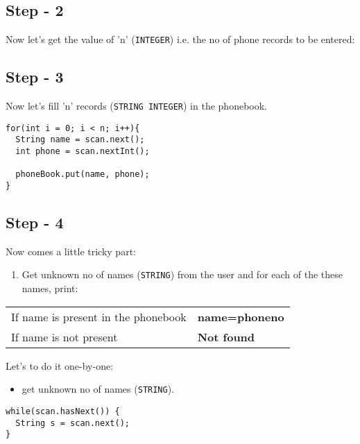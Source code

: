 \documentclass[11pt]{article}
\begin{document}
\subsection{Step - 2}
\label{sec:orgfd0e3b4}

Now let’s get the value of ’n’ (\texttt{INTEGER}) i.e. the no of phone records to be entered:

\subsection{Step - 3}
\label{sec:orgf1d191e}

Now let’s fill ’n’ records (\texttt{STRING INTEGER}) in the phonebook.

\begin{verbatim}
for(int i = 0; i < n; i++){
  String name = scan.next();
  int phone = scan.nextInt();

  phoneBook.put(name, phone);
}
\end{verbatim}

\subsection{Step - 4}
\label{sec:org300fdb0}

Now comes a little tricky part:

\begin{enumerate}
\item Get unknown no of names (\texttt{STRING}) from the user and for each of the these
names, print:
\end{enumerate}

\begin{center}
\begin{tabular}{ll}
If name is present in the phonebook & \textbf{name=phoneno}\\
If name is not present & \textbf{Not found}\\
\end{tabular}
\end{center}

Let’s to do it one-by-one:

\begin{itemize}
\item get unknown no of names (\texttt{STRING}).
\end{itemize}

\begin{verbatim}
while(scan.hasNext()) {
  String s = scan.next();
}
\end{verbatim}
\end{document}
